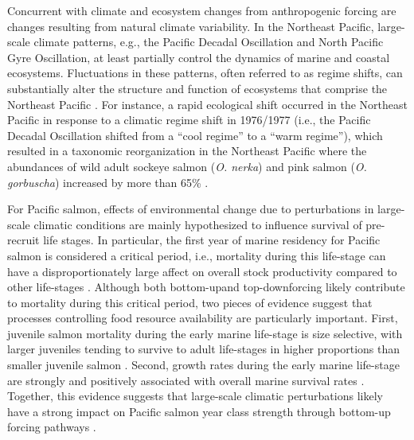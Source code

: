 Concurrent with climate and ecosystem changes from anthropogenic forcing are
changes resulting from natural climate variability. In the Northeast Pacific,
large-scale climate patterns, e.g., the Pacific Decadal Oscillation and North
Pacific Gyre Oscillation, at least partially control the dynamics of marine and
coastal ecosystems. Fluctuations in these patterns, often referred to as regime
shifts, can substantially alter the structure and function of ecosystems that
comprise the Northeast Pacific \citep{Chavez2003a}. For instance, a rapid
ecological shift occurred in the Northeast Pacific in response to a climatic
regime shift in 1976/1977 (i.e., the Pacific Decadal Oscillation shifted from a
``cool regime'' to a ``warm regime''), which resulted in a taxonomic
reorganization in the Northeast Pacific where the abundances of wild adult
sockeye salmon (\emph{O. nerka}) and pink salmon (\emph{O. gorbuscha}) increased
by more than 65\% \citep{Ruggerone2010a, Anderson1999a, Mueter2000a}.

For Pacific salmon, effects of environmental change due to perturbations in
large-scale climatic conditions are mainly hypothesized to influence survival of
pre-recruit life stages. In particular, the first year of marine residency for
Pacific salmon is considered a critical period, i.e., mortality during this
life-stage can have a disproportionately large affect on overall stock
productivity compared to other life-stages \citep{Parker1968a, Peterman1985a,
Beamish2001a, Wertheimer2007a}. Although both bottom-up\footnotemark[2] and
top-down\footnotemark[3] forcing likely contribute to mortality during this
critical period, two pieces of evidence suggest that processes controlling food
resource availability are particularly important. First, juvenile salmon
mortality during the early marine life-stage is size selective, with larger
juveniles tending to survive to adult life-stages in higher proportions than
smaller juvenile salmon \citep{Parker1971a, Holtby1990a, McGurk1996a,
Moss2005a}. Second, growth rates during the early marine life-stage are strongly
and positively associated with overall marine survival rates \citep{Cross2008a,
Duffy2011, Farley2007b}. Together, this evidence suggests that large-scale
climatic perturbations likely have a strong impact on Pacific salmon year class
strength through bottom-up forcing pathways \citep{Perry1996a, Armstrong2005a}.


